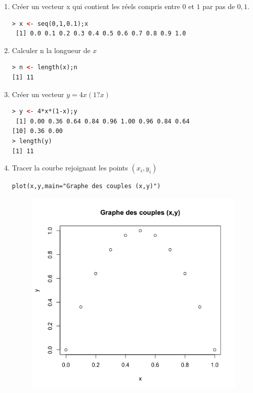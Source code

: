 \begin{enumerate}
\item Créer un vecteur x qui contient les réels compris entre $0$ et $1$ par pas de $0,1$.
\begin{lstlisting}[language=html]
> x <- seq(0,1,0.1);x
 [1] 0.0 0.1 0.2 0.3 0.4 0.5 0.6 0.7 0.8 0.9 1.0
\end{lstlisting}
\item Calculer n la longueur de $x$
\begin{lstlisting}[language=html]
> n <- length(x);n
[1] 11
\end{lstlisting}
\item Créer un vecteur $y = 4x(1 ? x)$
\begin{lstlisting}[language=html]
> y <- 4*x*(1-x);y
 [1] 0.00 0.36 0.64 0.84 0.96 1.00 0.96 0.84 0.64
[10] 0.36 0.00
> length(y)
[1] 11
\end{lstlisting}
\item Tracer la courbe rejoignant les points $(x_{i},y_{i})$
\begin{lstlisting}[language=html]
plot(x,y,main="Graphe des couples (x,y)")
\end{lstlisting}
\begin{figure}[H]\begin{center}\includegraphics[scale=0.5]{ilu/ExoPlot1.png}\end{center}\end{figure}

\end{enumerate}
